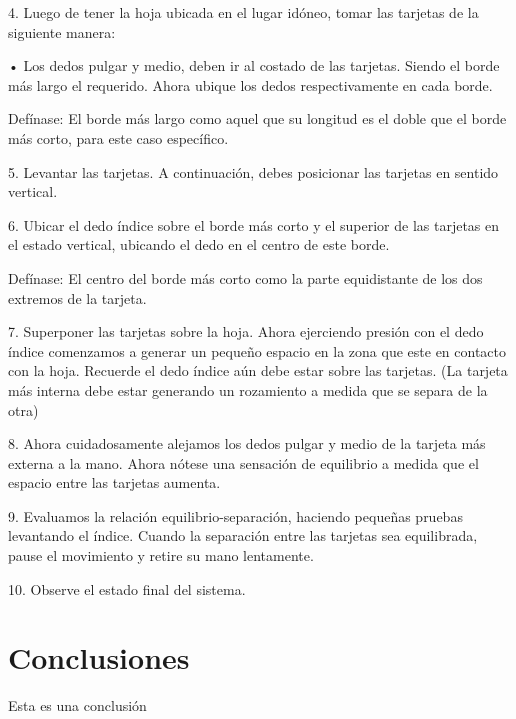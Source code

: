 \documentclass{article}
\begin{document}
4. Luego de tener la hoja ubicada en el lugar idóneo, tomar las tarjetas de la siguiente manera:

    •	Los dedos pulgar y medio, deben ir al costado de las tarjetas. Siendo el borde más largo el requerido. Ahora ubique los dedos respectivamente en cada borde.  

    Defínase: El borde más largo como aquel que su longitud es el doble que el borde más corto, para este caso específico.  

5. Levantar las tarjetas. A continuación, debes posicionar las tarjetas en sentido vertical.  

6. Ubicar el dedo índice sobre el borde más corto y el superior de las tarjetas en el estado vertical, ubicando el dedo en el centro de este borde. 

    Defínase: El centro del borde más corto como la parte equidistante de los dos extremos de la tarjeta.   

7.  Superponer las tarjetas sobre la hoja. Ahora ejerciendo presión con el dedo índice comenzamos a generar un pequeño espacio en la zona que este en contacto con la hoja. Recuerde el dedo índice aún debe estar sobre las tarjetas. 
    (La tarjeta más interna debe estar generando un rozamiento a medida que se separa de la otra)

8. Ahora cuidadosamente alejamos los dedos pulgar y medio de la tarjeta más externa a la mano. Ahora nótese una sensación de equilibrio a medida que el espacio entre las tarjetas aumenta. 

9. Evaluamos la relación equilibrio-separación, haciendo pequeñas pruebas levantando el índice. Cuando la separación entre las tarjetas sea equilibrada, pause el movimiento y retire su mano lentamente. 

10. Observe el estado final del sistema.  

\section{Conclusiones} 
Esta es una conclusión 



\end{document}
